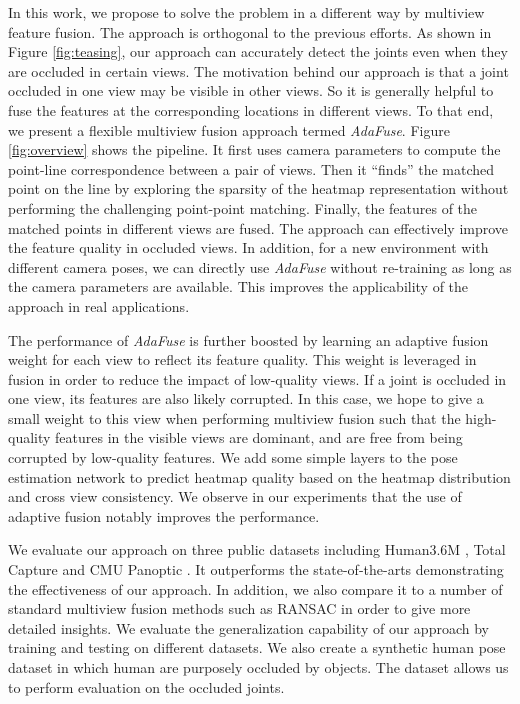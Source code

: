 In this work, we propose to solve the problem in a different way by multiview feature fusion. The approach is orthogonal to the previous efforts. As shown in Figure \ref{fig:teasing}, our approach can accurately detect the joints even when they are occluded in certain views. The motivation behind our approach is that a joint occluded in one view may be visible in other views. So it is generally helpful to fuse the features at the corresponding locations in different views. To that end, we present a flexible multiview fusion approach termed \emph{AdaFuse}. Figure \ref{fig:overview} shows the pipeline. It first uses camera parameters to compute the point-line correspondence between a pair of views. Then it ``finds'' the matched point on the line by exploring the sparsity of the heatmap representation without performing the challenging point-point matching. Finally, the features of the matched points in different views are fused. The approach can effectively improve the feature quality in occluded views. In addition, for a new environment with different camera poses, we can directly use \emph{AdaFuse} without re-training as long as the camera parameters are available. This improves the applicability of the approach in real applications.

The performance of \emph{AdaFuse} is further boosted by learning an adaptive fusion weight for each view to reflect its feature quality. This weight is leveraged in fusion in order to reduce the impact of low-quality views. If a joint is occluded in one view, its features are also likely corrupted. In this case, we hope to give a small weight to this view when performing multiview fusion such that the high-quality features in the visible views are dominant, and are free from being corrupted by low-quality features. We add some simple layers to the pose estimation network to predict heatmap quality based on the heatmap distribution and cross view consistency. We observe in our experiments that the use of adaptive fusion notably improves the performance.

We evaluate our approach on three public datasets including Human3.6M \citep{ionescu2014human3}, Total Capture \citep{trumble2017total} and CMU Panoptic \citep{joo2019panoptic}. It outperforms the state-of-the-arts demonstrating the effectiveness of our approach. In addition, we also compare it to a number of standard multiview fusion methods such as RANSAC in order to give more detailed insights. We evaluate the generalization capability of our approach by training and testing on different datasets. We also create a synthetic human pose dataset in which human are purposely occluded by objects. The dataset allows us to perform evaluation on the occluded joints.

